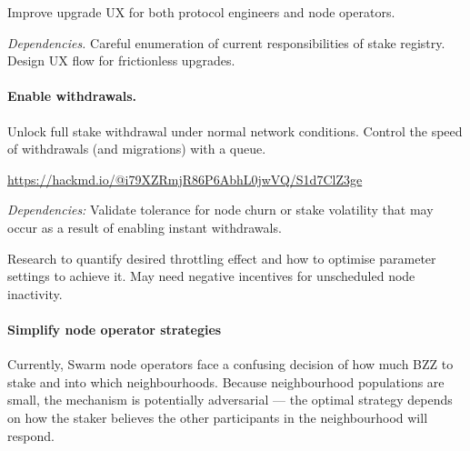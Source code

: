     Improve upgrade UX for both protocol engineers and node operators.

    \emph{Dependencies.}
    Careful enumeration of current responsibilities of stake registry.
    Design UX flow for frictionless upgrades.

\paragraph{Enable withdrawals.}
    Unlock full stake withdrawal under normal network conditions.
    Control the speed of withdrawals (and migrations) with a queue.

    \url{https://hackmd.io/@i79XZRmjR86P6AbhL0jwVQ/S1d7ClZ3ge}

    \emph{Dependencies:} 
    Validate tolerance for node churn or stake volatility that may occur as a result of enabling instant withdrawals.

    Research to quantify desired throttling effect and how to optimise parameter settings to achieve it.
    May need negative incentives for unscheduled node inactivity.

\paragraph{Simplify node operator strategies}
    Currently, Swarm node operators face a confusing decision of how much BZZ to stake and into which neighbourhoods.
    Because neighbourhood populations are small, the mechanism is potentially adversarial — the optimal strategy depends on how the staker believes the other participants in the neighbourhood will respond.

